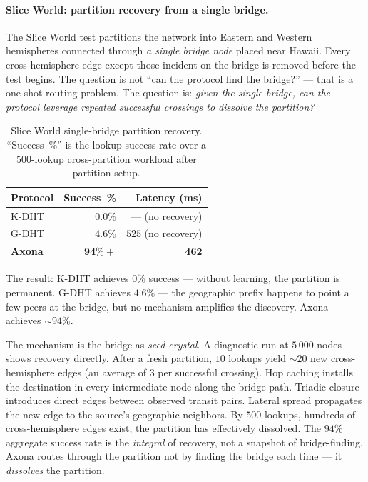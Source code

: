 \documentclass[conference]{IEEEtran}
\newcommand{\axona}{Axona\xspace}
\newcommand{\KDHT}{K-DHT\xspace}
\newcommand{\GDHT}{G-DHT\xspace}
\begin{document}
\paragraph{Slice World: partition recovery from a single bridge.}
The Slice World test partitions the network into Eastern and
Western hemispheres connected through \emph{a single bridge
node} placed near Hawaii.  Every cross-hemisphere edge except
those incident on the bridge is removed before the test
begins.  The question is not ``can the protocol find the
bridge?'' --- that is a one-shot routing problem.  The
question is: \emph{given the single bridge, can the protocol
leverage repeated successful crossings to dissolve the
partition?}

\begin{table}[t]
\centering
\caption{Slice World single-bridge partition recovery.
``Success~\%'' is the lookup success rate over a $500$-lookup
cross-partition workload after partition setup.}
\label{tab:slice}
\small
\begin{tabular}{@{}lrr@{}}
\toprule
\textbf{Protocol} & \textbf{Success~\%} & \textbf{Latency (ms)} \\
\midrule
\KDHT & $0.0\%$ & --- (no recovery) \\
\GDHT & $4.6\%$ & $525$ (no recovery) \\
\textbf{\axona} & $\mathbf{94\%+}$ & $\mathbf{462}$ \\
\bottomrule
\end{tabular}
\end{table}

The result: \KDHT achieves $0\%$ success --- without learning,
the partition is permanent.  \GDHT achieves $4.6\%$ --- the
geographic prefix happens to point a few peers at the bridge,
but no mechanism amplifies the discovery.  \axona achieves
$\sim\!94\%$.

The mechanism is the bridge as \emph{seed crystal}.  A
diagnostic run at $5\,000$ nodes shows recovery directly.
After a fresh partition, $10$ lookups yield $\sim\!20$ new
cross-hemisphere edges (an average of $3$ per successful
crossing).  Hop caching installs the destination in every
intermediate node along the bridge path.  Triadic closure
introduces direct edges between observed transit pairs.
Lateral spread propagates the new edge to the source's
geographic neighbors.  By $500$ lookups, hundreds of
cross-hemisphere edges exist; the partition has effectively
dissolved.  The $94\%$ aggregate success rate is the
\emph{integral} of recovery, not a snapshot of bridge-finding.
\axona routes through the partition not by finding the bridge
each time --- it \emph{dissolves} the partition.
\end{document}
